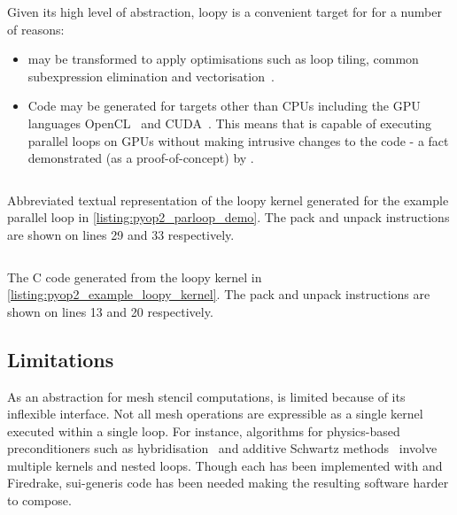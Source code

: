 \documentclass[thesis]{subfiles}
\begin{document}
Given its high level of abstraction, loopy is a convenient target for  for a number of reasons:
\begin{itemize}
  \item
     may be transformed to apply optimisations such as loop tiling, common subexpression elimination and vectorisation~\cite{klocknerLooPyFortran2015,klocknerArrayProgramTransformation2016,sunStudyVectorizationMatrixfree2020}.
  \item
    Code may be generated for targets other than CPUs including the GPU languages OpenCL~\cite{stoneOpenCLParallelProgramming2010a} and CUDA~\cite{CUDAProgrammingGuide}.
    This means that  is capable of executing parallel loops on GPUs without making intrusive changes to the code - a fact demonstrated (as a proof-of-concept) by \cite{fenics2021-kulkarni}.
\end{itemize}

\begin{listing}
  \centering
  \begin{minipage}{.9\textwidth}
    \inputminted[linenos]{text}{./scripts/artefacts/pyop2_example_loopy_kernel_tidy.txt}
  \end{minipage}
  \caption{
    Abbreviated textual representation of the loopy kernel generated for the example parallel loop in \cref{listing:pyop2_parloop_demo}.
    The pack and unpack instructions are shown on lines 29 and 33 respectively.
  }
  \label{listing:pyop2_example_loopy_kernel}
\end{listing}

\begin{listing}
  \centering
  \begin{minipage}{.9\textwidth}
    \inputminted[linenos]{c}{./scripts/artefacts/pyop2_example_c_code_tidy.c}
  \end{minipage}
  \caption{
    The C code generated from the loopy kernel in \cref{listing:pyop2_example_loopy_kernel}.
    The pack and unpack instructions are shown on lines 13 and 20 respectively.
  }
  \label{listing:pyop2_example_c_code}
\end{listing}

\subsection{Limitations}

As an abstraction for mesh stencil computations,  is limited because of its inflexible interface.
Not all mesh operations are expressible as a single kernel executed within a single loop.
For instance, algorithms for physics-based preconditioners such as hybridisation~\cite{gibsonSlateExtendingFiredrake2020} and additive Schwartz methods~\cite{farrellPCPATCHSoftwareTopological2021} involve multiple kernels and nested loops.
Though each has been implemented with  and Firedrake, sui-generis code has been needed making the resulting software harder to compose.
\end{document}

